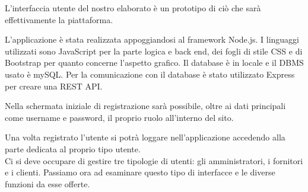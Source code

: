L'interfaccia utente del nostro elaborato è un prototipo di ciò che sarà effettivamente la piattaforma.\\
\begin{center}
\end{center}
L'applicazione è stata realizzata appoggiandosi al framework Node.js. 
I linguaggi utilizzati sono JavaScript per la parte logica e back end, dei fogli di stile CSS e di Bootstrap per quanto concerne l'aspetto grafico. 
Il database è in locale e il DBMS usato è mySQL.
Per la comunicazione con il database è stato utilizzato Express per creare una REST API.\\
\begin{center}
\end{center}
Nella schermata iniziale di registrazione sarà possibile, oltre ai dati principali come username e password, il proprio ruolo all'interno del sito.\\
\begin{center}
\end{center}
Una volta registrato l'utente si potrà loggare nell'applicazione accedendo alla parte dedicata al proprio tipo utente.\\
\vfill
Ci si deve occupare di gestire tre tipologie di utenti: gli amministratori, i fornitori e i clienti.
Passiamo ora ad esaminare questo tipo di interfacce e le diverse funzioni da esse offerte.